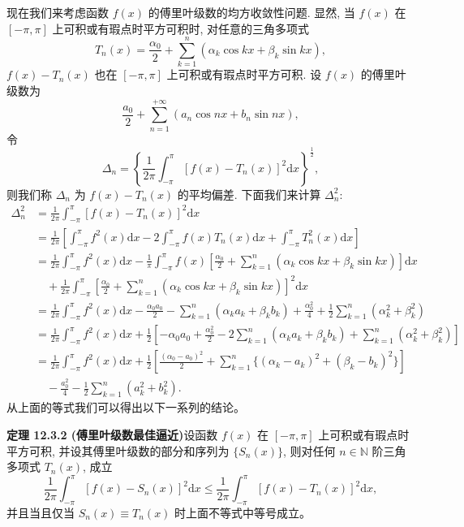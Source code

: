 \documentclass[UTF8,12pt,a4paper,fontset=fandol]{ctexart}
\begin{document}
现在我们来考虑函数 $f(x)$ 的傅里叶级数的均方收敛性问题. 显然, 当 $f(x)$ 在 $[-\pi,\pi]$ 上可积或有瑕点时平方可积时, 对任意的三角多项式
\[
  T_n(x)=\frac{\alpha_0}{2}+\sum_{k=1}^n(\alpha_k\cos kx+\beta_k\sin kx),
\]
$f(x)-T_n(x)$ 也在 $[-\pi,\pi]$ 上可积或有瑕点时平方可积. 设 $f(x)$ 的傅里叶级数为
\[
  \frac{a_0}{2}+\sum_{n=1}^{+\infty}(a_n\cos nx+b_n\sin nx),
\]
令
\[
  \Delta_n=\left\{\frac1{2\pi}\int_{-\pi}^{\pi}[f(x)-T_n(x)]^2\mathrm dx\right\}^{\frac12},
\]
则我们称 $\Delta_n$ 为 $f(x)-T_n(x)$ 的平均偏差. 下面我们来计算 $\Delta_n^2$:
\[
\begin{aligned}
  \Delta_n^2
  &=\frac1{2\pi}\int_{-\pi}^{\pi}[f(x)-T_n(x)]^2\mathrm dx\\
  &=\frac1{2\pi}\left[
    \int_{-\pi}^{\pi}f^2(x)\mathrm dx
    -2\int_{-\pi}^{\pi}f(x)T_n(x)\mathrm dx
    +\int_{-\pi}^{\pi}T_n^2(x)\mathrm dx
  \right]\\
  &=\frac1{2\pi}\int_{-\pi}^{\pi}f^2(x)\mathrm dx
    -\frac1\pi\int_{-\pi}^{\pi}f(x)
    \left[\frac{\alpha_0}{2}+\sum_{k=1}^n(\alpha_k\cos kx+\beta_k\sin kx)\right]\mathrm dx\\
  &\quad+\frac1{2\pi}\int_{-\pi}^{\pi}
    \left[\frac{\alpha_0}{2}+\sum_{k=1}^n(\alpha_k\cos kx+\beta_k\sin kx)\right]^2\mathrm dx\\
  &=\frac1{2\pi}\int_{-\pi}^{\pi}f^2(x)\mathrm dx
    -\frac{\alpha_0a_0}{2}
    -\sum_{k=1}^n(\alpha_ka_k+\beta_kb_k)
    +\frac{\alpha_0^2}{4}
    +\frac12\sum_{k=1}^n(\alpha_k^2+\beta_k^2)\\
  &=\frac1{2\pi}\int_{-\pi}^{\pi}f^2(x)\mathrm dx
    +\frac12\left[
      -\alpha_0a_0+\frac{\alpha_0^2}{2}
      -2\sum_{k=1}^n(\alpha_ka_k+\beta_kb_k)
      +\sum_{k=1}^n(\alpha_k^2+\beta_k^2)
    \right]\\
  &=\frac1{2\pi}\int_{-\pi}^{\pi}f^2(x)\mathrm dx
    +\frac12\left[
      \frac{(\alpha_0-a_0)^2}{2}
      +\sum_{k=1}^n\{(\alpha_k-a_k)^2+(\beta_k-b_k)^2\}
    \right]\\
  &\quad-\frac{a_0^2}{4}
    -\frac12\sum_{k=1}^n(a_k^2+b_k^2).
\end{aligned}
\]
从上面的等式我们可以得出以下一系列的结论。

\noindent\textbf{定理 12.3.2 (傅里叶级数最佳逼近)}\quad 设函数 $f(x)$ 在 $[-\pi,\pi]$ 上可积或有瑕点时平方可积, 并设其傅里叶级数的部分和序列为 $\{S_n(x)\}$, 则对任何 $n\in\mathbb N$ 阶三角多项式 $T_n(x)$, 成立
\[
  \frac1{2\pi}\int_{-\pi}^{\pi}[f(x)-S_n(x)]^2\mathrm dx
  \leqslant
  \frac1{2\pi}\int_{-\pi}^{\pi}[f(x)-T_n(x)]^2\mathrm dx,
\]
并且当且仅当 $S_n(x)\equiv T_n(x)$ 时上面不等式中等号成立。
\end{document}
